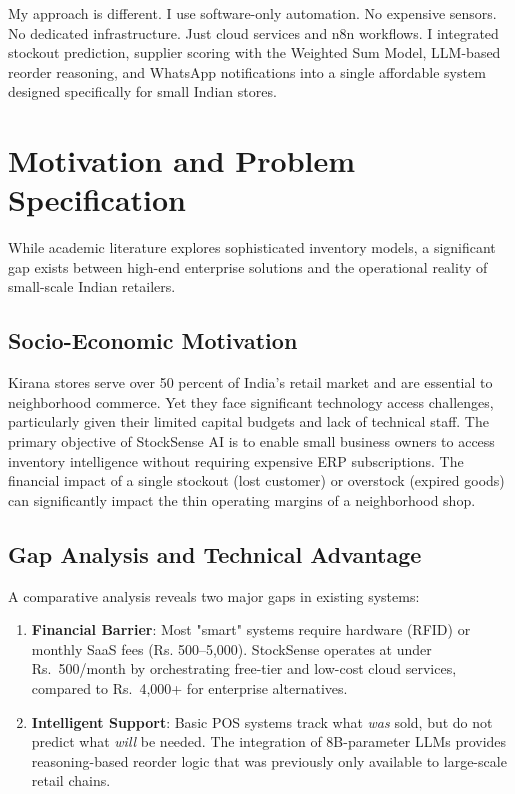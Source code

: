 \documentclass[journal]{IEEEtran}
\begin{document}
My approach is different. I use software-only automation. No expensive sensors. No dedicated infrastructure. Just cloud services and n8n workflows. I integrated stockout prediction, supplier scoring with the Weighted Sum Model, LLM-based reorder reasoning, and WhatsApp notifications into a single affordable system designed specifically for small Indian stores.

\section{Motivation and Problem Specification}

While academic literature explores sophisticated inventory models, a significant gap exists between high-end enterprise solutions and the operational reality of small-scale Indian retailers.

\subsection{Socio-Economic Motivation}
Kirana stores serve over 50 percent of India's retail market and are essential to neighborhood commerce. Yet they face significant technology access challenges, particularly given their limited capital budgets and lack of technical staff. The primary objective of StockSense AI is to enable small business owners to access inventory intelligence without requiring expensive ERP subscriptions. The financial impact of a single stockout (lost customer) or overstock (expired goods) can significantly impact the thin operating margins of a neighborhood shop.

\subsection{Gap Analysis and Technical Advantage}
A comparative analysis reveals two major gaps in existing systems:
\begin{enumerate}
    \item \textbf{Financial Barrier}: Most "smart" systems require hardware (RFID) or monthly SaaS fees (Rs. 500--5,000). StockSense operates at under Rs.~500/month by orchestrating free-tier and low-cost cloud services, compared to Rs.~4,000+ for enterprise alternatives.
    \item \textbf{Intelligent Support}: Basic POS systems track what \textit{was} sold, but do not predict what \textit{will} be needed. The integration of 8B-parameter LLMs provides reasoning-based reorder logic that was previously only available to large-scale retail chains.
\end{enumerate}
\end{document}
